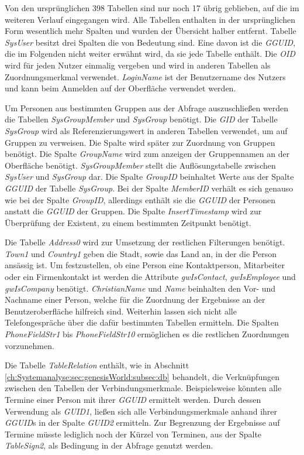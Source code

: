 Von den ursprünglichen 398 Tabellen sind nur noch 17 übrig geblieben, auf die im weiteren Verlauf eingegangen wird. Alle Tabellen enthalten in der ursprünglichen Form wesentlich mehr Spalten und wurden der Übersicht halber entfernt. Tabelle \textit{SysUser} besitzt drei Spalten die von Bedeutung sind. Eine davon ist die \textit{GGUID}, die im Folgenden nicht weiter erwähnt wird, da sie jede Tabelle enthält. Die \textit{OID} wird für jeden Nutzer einmalig vergeben und wird in anderen Tabellen als Zuordnungsmerkmal verwendet. \textit{LoginName} ist der Benutzername des Nutzers und kann beim Anmelden auf der Oberfläche verwendet werden. 

Um Personen aus bestimmten Gruppen aus der Abfrage auszuschließen werden die Tabellen \textit{SysGroupMember} und \textit{SysGroup} benötigt. Die \textit{GID} der Tabelle \textit{SysGroup} wird als Referenzierungswert in anderen Tabellen verwendet, um auf Gruppen zu verweisen. Die Spalte wird später zur Zuordnung von Gruppen benötigt. Die Spalte \textit{GroupName} wird zum anzeigen der Gruppennamen an der Oberfläche benötigt.  \textit{SysGroupMember} stellt die Auflösungstabelle zwischen \textit{SysUser} und \textit{SysGroup} dar. Die Spalte \textit{GroupID} beinhaltet Werte aus der Spalte \textit{GGUID} der Tabelle \textit{SysGroup}. Bei der Spalte \textit{MemberID} verhält es sich genauso wie bei der Spalte \textit{GroupID}, allerdings enthält sie die \textit{GGUID} der Personen anstatt die \textit{GGUID} der Gruppen. Die Spalte \textit{InsertTimestamp} wird zur Überprüfung der Existent, zu einem bestimmten Zeitpunkt benötigt.

Die Tabelle \textit{Address0} wird zur Umsetzung der restlichen Filterungen benötigt. \textit{Town1} und \textit{Country1} geben die Stadt, sowie das Land an, in der die Person ansässig ist. Um festzustellen, ob eine Person eine Kontaktperson, Mitarbeiter oder ein Firmenkontakt ist werden die Attribute \textit{gwIsContact}, \textit{gwIsEmployee} und \textit{gwIsCompany} benötigt. \textit{ChristianName} und \textit{Name} beinhalten den Vor- und Nachname einer Person, welche für die Zuordnung der Ergebnisse an der Benutzeroberfläche hilfreich sind. Weiterhin lassen sich  nicht alle Telefongespräche über die dafür bestimmten Tabellen ermitteln. Die Spalten \textit{PhoneFieldStr1} bis \textit{PhoneFieldStr10} ermöglichen es die restlichen Zuordnungen vorzunehmen.

Die Tabelle \textit{TableRelation} enthält, wie in Abschnitt \ref{ch:Systemanalyse:sec:genesisWorld:subsec:db} behandelt, die Verknüpfungen zwischen den Tabellen der Verbindungsmerkmale. Beispielsweise könnten alle Termine einer Person mit ihrer \textit{GGUID} ermittelt werden. Durch dessen Verwendung als \textit{GUID1}, ließen sich alle Verbindungsmerkmale anhand ihrer \textit{GGUID}s in der Spalte \textit{GUID2} ermitteln. Zur Begrenzung der Ergebnisse auf Termine müsste lediglich noch der Kürzel von Terminen, aus der Spalte \textit{TableSign2}, als Bedingung in der Abfrage genutzt werden.

